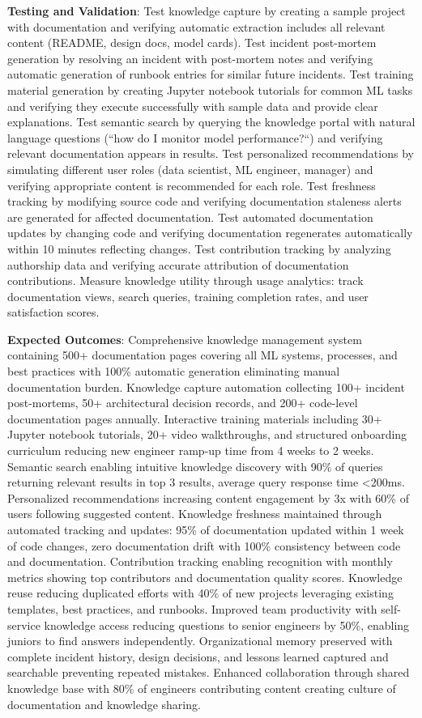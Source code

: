 \textbf{Testing and Validation}: Test knowledge capture by creating a sample project with documentation and verifying automatic extraction includes all relevant content (README, design docs, model cards). Test incident post-mortem generation by resolving an incident with post-mortem notes and verifying automatic generation of runbook entries for similar future incidents. Test training material generation by creating Jupyter notebook tutorials for common ML tasks and verifying they execute successfully with sample data and provide clear explanations. Test semantic search by querying the knowledge portal with natural language questions (``how do I monitor model performance?``) and verifying relevant documentation appears in results. Test personalized recommendations by simulating different user roles (data scientist, ML engineer, manager) and verifying appropriate content is recommended for each role. Test freshness tracking by modifying source code and verifying documentation staleness alerts are generated for affected documentation. Test automated documentation updates by changing code and verifying documentation regenerates automatically within 10 minutes reflecting changes. Test contribution tracking by analyzing authorship data and verifying accurate attribution of documentation contributions. Measure knowledge utility through usage analytics: track documentation views, search queries, training completion rates, and user satisfaction scores.

\textbf{Expected Outcomes}: Comprehensive knowledge management system containing 500+ documentation pages covering all ML systems, processes, and best practices with 100\% automatic generation eliminating manual documentation burden. Knowledge capture automation collecting 100+ incident post-mortems, 50+ architectural decision records, and 200+ code-level documentation pages annually. Interactive training materials including 30+ Jupyter notebook tutorials, 20+ video walkthroughs, and structured onboarding curriculum reducing new engineer ramp-up time from 4 weeks to 2 weeks. Semantic search enabling intuitive knowledge discovery with 90\% of queries returning relevant results in top 3 results, average query response time <200ms. Personalized recommendations increasing content engagement by 3x with 60\% of users following suggested content. Knowledge freshness maintained through automated tracking and updates: 95\% of documentation updated within 1 week of code changes, zero documentation drift with 100\% consistency between code and documentation. Contribution tracking enabling recognition with monthly metrics showing top contributors and documentation quality scores. Knowledge reuse reducing duplicated efforts with 40\% of new projects leveraging existing templates, best practices, and runbooks. Improved team productivity with self-service knowledge access reducing questions to senior engineers by 50\%, enabling juniors to find answers independently. Organizational memory preserved with complete incident history, design decisions, and lessons learned captured and searchable preventing repeated mistakes. Enhanced collaboration through shared knowledge base with 80\% of engineers contributing content creating culture of documentation and knowledge sharing.

